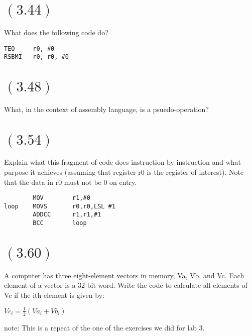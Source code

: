 \documentclass[letterpaper,12pt,titlepage]{article}
\begin{document}
\begin{mdframed}[style=MyFrame]
\end{mdframed}

\section*{$(3.44)$} What does the following code do?
\begin{verbatim}
TEQ     r0, #0
RSBMI   r0, r0, #0
\end{verbatim}

\begin{mdframed}[style=MyFrame]
\end{mdframed}

\section*{$(3.48)$} What, in the context of assembly language, is a psuedo-operation?

\begin{mdframed}[style=MyFrame]
\end{mdframed}

\section*{$(3.54)$} Explain what this fragment of code does instruction by instruction and what purpose it achieves (assuming that register r0 is the register of interest). Note that the data in r0 must not be 0 on entry.
\begin{verbatim}
        MOV        r1,#0
loop    MOVS       r0,r0,LSL #1
        ADDCC      r1,r1,#1
        BCC        loop
\end{verbatim}

\begin{mdframed}[style=MyFrame]
\end{mdframed}

\section*{$(3.60)$} A computer has three eight-element vectors in memory, Va, Vb, and Vc. Each element of a vector is a 32-bit word. Write the code to calculate all elements of Vc if the ith element is given by:

\thinspace

$Vc_i = \frac{1}{2} ( Va_i + Vb_i)$

\thinspace

note: This is a repeat of the one of the exercises we did for lab 3.
\end{document}
